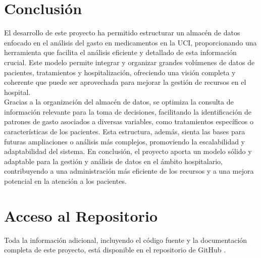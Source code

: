 \documentclass{article}
\begin{document}
\section{Conclusión}
\label{sec:conclusion}


El desarrollo de este proyecto ha permitido estructurar un almacén de datos enfocado en el análisis del gasto en medicamentos en la UCI, proporcionando una herramienta que facilita el análisis eficiente y detallado de esta información crucial. Este modelo permite integrar y organizar grandes volúmenes de datos de pacientes, tratamientos y hospitalización, ofreciendo una visión completa y coherente que puede ser aprovechada para mejorar la gestión de recursos en el hospital.
\\

Gracias a la organización del almacén de datos, se optimiza la consulta de información relevante para la toma de decisiones, facilitando la identificación de patrones de gasto asociados a diversas variables, como tratamientos específicos o características de los pacientes. Esta estructura, además, sienta las bases para futuras ampliaciones o análisis más complejos, promoviendo la escalabilidad y adaptabilidad del sistema. En conclusión, el proyecto aporta un modelo sólido y adaptable para la gestión y análisis de datos en el ámbito hospitalario, contribuyendo a una administración más eficiente de los recursos y a una mejora potencial en la atención a los pacientes.

\newpage
\section{Acceso al Repositorio}

Toda la información adicional, incluyendo el código fuente y la documentación completa de este proyecto, está disponible en el repositorio de GitHub \cite{silva2024github}.

\end{document}

